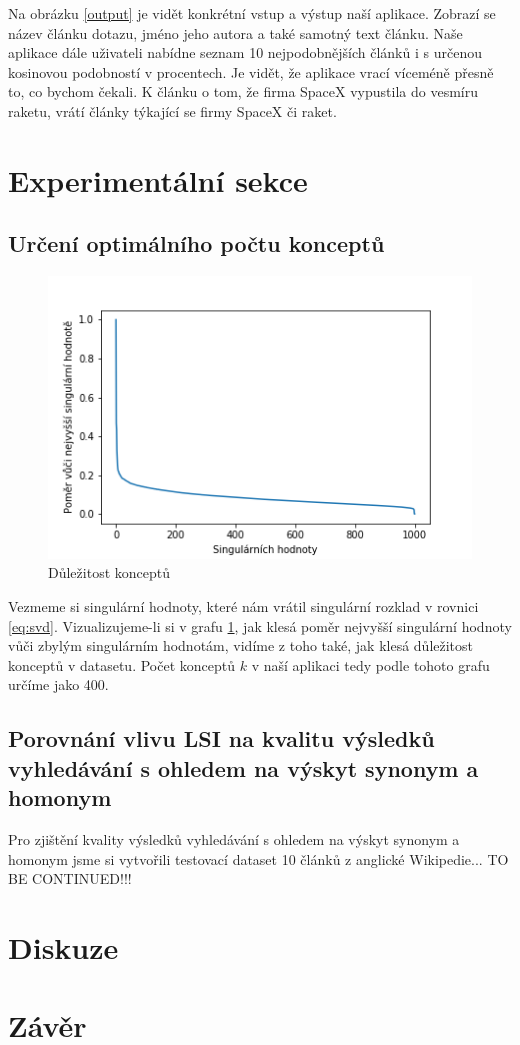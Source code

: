 \documentclass[11pt]{scrartcl} %
\begin{document}
Na obrázku \ref{output} je vidět konkrétní vstup a výstup naší aplikace. Zobrazí se název článku dotazu, jméno jeho autora a také samotný text článku. Naše aplikace dále uživateli nabídne seznam 10 nejpodobnějších článků i s určenou kosinovou podobností v procentech. Je vidět, že aplikace vrací víceméně přesně to, co bychom čekali. K článku o tom, že firma SpaceX vypustila do vesmíru raketu, vrátí články týkající se firmy SpaceX či raket.

\section{Experimentální sekce}

\subsection{Určení optimálního počtu konceptů}

\begin{figure}[h] %
	\centering
	\includegraphics[width=0.7\columnwidth]{singular_values.png}
	\caption{Důležitost konceptů}
	\label{concepts}
\end{figure}

Vezmeme si singulární hodnoty, které nám vrátil singulární rozklad v rovnici \ref{eq:svd}. Vizualizujeme-li si v grafu \ref{concepts}, jak klesá poměr nejvyšší singulární hodnoty vůči zbylým singulárním hodnotám, vidíme z toho také, jak klesá důležitost konceptů v datasetu. Počet konceptů $k$ v naší aplikaci tedy podle tohoto grafu určíme jako 400.

\subsection{Porovnání vlivu LSI na kvalitu výsledků vyhledávání s ohledem na výskyt synonym a homonym}

Pro zjištění kvality výsledků vyhledávání s ohledem na výskyt synonym a homonym jsme si vytvořili testovací dataset 10 článků z anglické Wikipedie... TO BE CONTINUED!!!

\section{Diskuze}


\section{Závěr}
\end{document}
